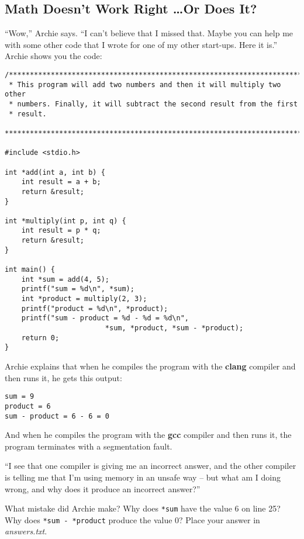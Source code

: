 \subsection{Math Doesn't Work Right \dots Or Does It?} \label{subsec:danglingPointers}

``Wow,'' Archie says.
``I can't believe that I missed that.
Maybe you can help me with some other code that I wrote for one of my other start-ups.
Here it is.'' Archie shows you the code:

\begin{lstlisting}
/***********************************************************************
 * This program will add two numbers and then it will multiply two other
 * numbers. Finally, it will subtract the second result from the first
 * result.
 ***********************************************************************/

#include <stdio.h>

int *add(int a, int b) {
    int result = a + b;
    return &result;
}

int *multiply(int p, int q) {
    int result = p * q;
    return &result;
}

int main() {
    int *sum = add(4, 5);
    printf("sum = %d\n", *sum);
    int *product = multiply(2, 3);
    printf("product = %d\n", *product);
    printf("sum - product = %d - %d = %d\n",
                        *sum, *product, *sum - *product);
    return 0;
}
\end{lstlisting}

Archie explains that when he compiles the program with the \textbf{clang} compiler and then runs it, he gets this output:

\begin{verbatim}
sum = 9
product = 6
sum - product = 6 - 6 = 0
\end{verbatim}

And when he compiles the program with the \textbf{gcc} compiler and then runs it, the program terminates with a segmentation fault.

``I see that one compiler is giving me an incorrect answer, and the other compiler is telling me that I'm using memory in an unsafe way -- but what am I doing wrong, and why does it produce an incorrect answer?''

What mistake did Archie make?
Why does \lstinline{*sum} have the value 6 on line 25?
Why does \lstinline{*sum - *product} produce the value 0?
Place your answer in \textit{answers.txt}.
